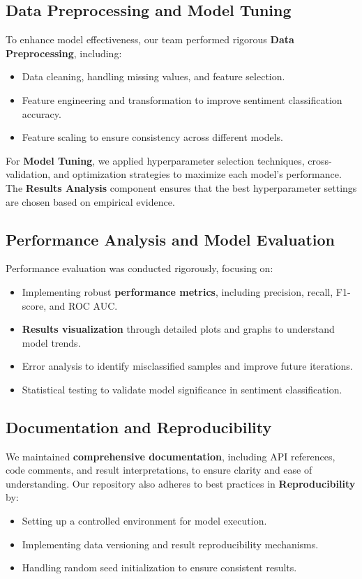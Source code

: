 \subsection{Data Preprocessing and Model Tuning}

To enhance model effectiveness, our team performed rigorous \textbf{Data Preprocessing}, including:
\begin{itemize}
    \item Data cleaning, handling missing values, and feature selection.
    \item Feature engineering and transformation to improve sentiment classification accuracy.
    \item Feature scaling to ensure consistency across different models.
\end{itemize}

For \textbf{Model Tuning}, we applied hyperparameter selection techniques, cross-validation, and optimization strategies to maximize each model’s performance. The \textbf{Results Analysis} component ensures that the best hyperparameter settings are chosen based on empirical evidence.

\subsection{Performance Analysis and Model Evaluation}

Performance evaluation was conducted rigorously, focusing on:
\begin{itemize}
    \item Implementing robust \textbf{performance metrics}, including precision, recall, F1-score, and ROC AUC.
    \item \textbf{Results visualization} through detailed plots and graphs to understand model trends.
    \item Error analysis to identify misclassified samples and improve future iterations.
    \item Statistical testing to validate model significance in sentiment classification.
\end{itemize}

\subsection{Documentation and Reproducibility}

We maintained \textbf{comprehensive documentation}, including API references, code comments, and result interpretations, to ensure clarity and ease of understanding. Our repository also adheres to best practices in \textbf{Reproducibility} by:
\begin{itemize}
    \item Setting up a controlled environment for model execution.
    \item Implementing data versioning and result reproducibility mechanisms.
    \item Handling random seed initialization to ensure consistent results.
\end{itemize}

